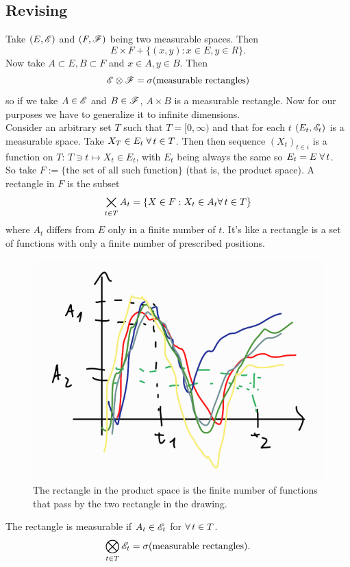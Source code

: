\documentclass[crop=false, class=article]{standalone}
\begin{document}
\subsection{Revising \brm}
Take $(E,\mathscr{E})$ and $(F,\mathscr{F})$ being two measurable spaces. Then
\begin{equation*}
	E\times F+\{(x,y):x\in E,y\in R\}.
\end{equation*}
Now take $A\subset E,B\subset F$ and $x\in A,y\in B$. Then
\begin{equation*}
	\mathscr{E}\otimes\mathscr{F}=\sigma(\text{measurable rectangles})
\end{equation*}
so if we take $A\in\mathscr{E}$ and $B\in\mathscr{F}$, $A\times B$ is a measurable rectangle. Now for our purposes we have to generalize it to infinite dimensions.\\
Consider an arbitrary set $T$ such that $T=[0,\infty)$ and that for each $t$ $(E_{t},\mathscr{E}_{t})$ is a measurable space. Take $X_{T}\in E_{t}\;\forall\, t\in T$. Then then sequence ${(X_{t})}_{t\in i}$ is a function on $T$: $T\ni t\mapsto X_{t}\in E_{t}$, with $E_{t}$ being always the same so $E_{t}=E\;\forall\, t$.\\
So take $F:=\{\text{the set of all such function}\}$ (that is, the product space). A rectangle in $F$ is the subset
\[\bigtimes_{t\in T}A_{t}=\{X\in F:X_{t}\in A_{t}\forall\, t\in T\}\]
where $A_{t}$ differs from $E$ only in a finite number of $t$. It's like a rectangle is a set of functions with only a finite number of prescribed positions.
\begin{figure}[H]
	\centering
	\includegraphics[width=0.7\linewidth]{images/screenshot001}
	\caption{The rectangle in the product space is the finite number of functions that pass by the two rectangle in the drawing.}
	\label{fig:screenshot001}
\end{figure}
The rectangle is measurable if $A_{t}\in\mathscr{E}_{t}$ for $\forall\, t\in T$.
\begin{equation*}
	\bigotimes_{t\in T}\mathscr{E}_{t}=\sigma(\text{measurable rectangles}).
\end{equation*}
\end{document}
